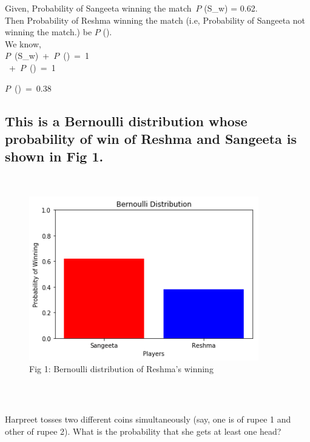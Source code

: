\documentclass[journal,12pt,twocolumn]{IEEEtran}
\begin{document}
Given, Probability of Sangeeta winning the match\ $P$ (S_w) = 0.62.\\

Then Probability of Reshma winning the match (i.e, Probability of Sangeeta not winning the match.) be $P$ ().\\

We know,\\

$P$\ (S_w)\ +\ $P$\ ()\ =\ 1\\

\ +\ $P$\ ()\ =\ 1\\
\begin{mdframed}
\implies $P$\ ()\ =\ 0.38\\
\end{mdframed}
\subsection*{This is a Bernoulli distribution whose probability of win of Reshma and Sangeeta is shown in Fig 1.}\\

\begin{figure}[h!]
    \centering
    \includegraphics[width=10cm]{Assignment-2/Codes/Figures/bern_1_18.png}
    \caption*{Fig 1: Bernoulli distribution of Reshma's winning}
\end{figure}
\\
\subsection*{}
Harpreet tosses two different coins simultaneously (say, one is of rupee 1 and other of rupee 2). What is the probability that she gets at least one head?
\subsection*{}\\
\end{document}
